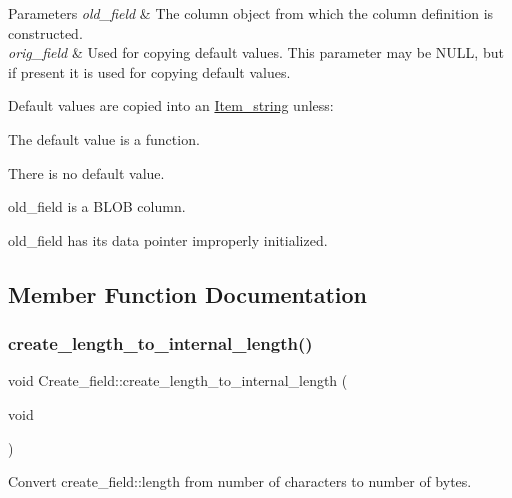 \begin{DoxyParams}{Parameters}
{\em old\+\_\+field} & The column object from which the column definition is constructed. \\
\hline
{\em orig\+\_\+field} & Used for copying default values. This parameter may be N\+U\+LL, but if present it is used for copying default values.\\
\hline
\end{DoxyParams}
Default values are copied into an \mbox{\hyperlink{classItem__string}{Item\+\_\+string}} unless\+: \begin{DoxyItemize}
\item The default value is a function. \item There is no default value. \item old\+\_\+field is a B\+L\+OB column. \item old\+\_\+field has its data pointer improperly initialized. \end{DoxyItemize}


\subsection{Member Function Documentation}
\mbox{\label{classCreate__field_a19af2570fa554626f604637ad2a98894}} 
\subsubsection{\texorpdfstring{create\+\_\+length\+\_\+to\+\_\+internal\+\_\+length()}{create\_length\_to\_internal\_length()}}
{\footnotesize\ttfamily void Create\+\_\+field\+::create\+\_\+length\+\_\+to\+\_\+internal\+\_\+length (\begin{DoxyParamCaption}\item[{void}]{ }\end{DoxyParamCaption})}

Convert create\+\_\+field\+::length from number of characters to number of bytes. \mbox{\label{classCreate__field_a14a438364919ba717a312097a0ae164c}} 
